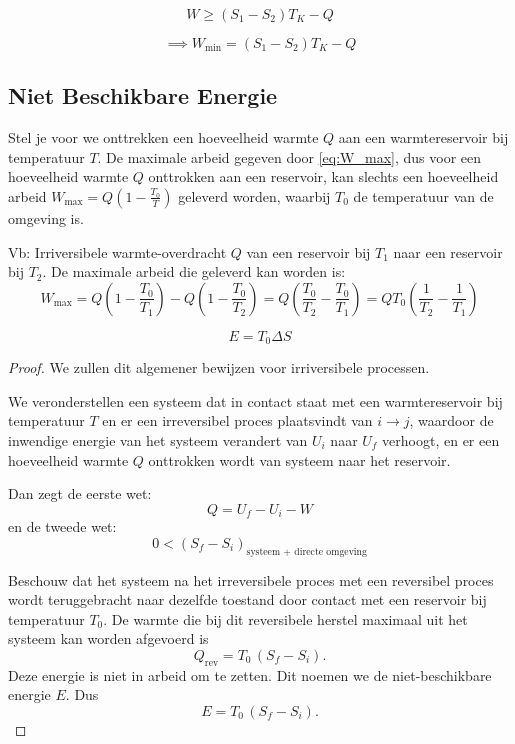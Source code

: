 \[
W \geq (S_1-S_2)T_K - Q
\]

\begin{equation}
\label{eq:W_min}
\implies W_{\text{min}} = (S_1-S_2)T_K - Q
\end{equation}

\subsection{Niet Beschikbare Energie}

Stel je voor we onttrekken een hoeveelheid warmte \(Q\) aan een warmtereservoir bij temperatuur \(T\).
De maximale arbeid gegeven door \eqref{eq:W_max}, dus voor een hoeveelheid warmte \(Q\) onttrokken aan een reservoir,
kan slechts een hoeveelheid arbeid \(W_{\text{max}} = Q \left(1 - \frac{T_0}{T}\right)\) geleverd worden, waarbij \(T_0\) de temperatuur van de omgeving is.

Vb: Irriversibele warmte-overdracht \(Q\) van een reservoir bij \(T_1\) naar een reservoir bij \(T_2\).
De maximale arbeid die geleverd kan worden is:
\[
W_{\text{max}}
=
Q \left(1 - \frac{T_0}{T_1}\right) - Q \left(1 - \frac{T_0}{T_2}\right)
=
Q \left(\frac{T_0}{T_2} - \frac{T_0}{T_1}\right)
=
Q T_0 \left(\frac{1}{T_2} - \frac{1}{T_1}\right)
\]

\[E = T_0 \Delta S\]

\begin{proof}
    We zullen dit algemener bewijzen voor irriversibele processen.

    We veronderstellen een systeem dat in contact staat met een warmtereservoir bij temperatuur \(T\) en er een irreversibel proces plaatsvindt van \(i \to j\),
    waardoor de inwendige energie van het systeem verandert van \(U_i\) naar \(U_f\) verhoogt, en er een hoeveelheid warmte \(Q\) onttrokken wordt van systeem naar het reservoir.

    Dan zegt de eerste wet:
    \[Q = U_f - U_i - W\]
    en de tweede wet:
    \[0 < (S_f-S_i)_{\text{systeem + directe omgeving}}\]

    Beschouw dat het systeem na het irreversibele proces met een reversibel proces wordt teruggebracht
    naar dezelfde toestand door contact met een reservoir bij temperatuur $T_0$.
    De warmte die bij dit reversibele herstel maximaal uit het systeem kan worden afgevoerd is
    \[Q_{\mathrm{rev}} = T_0\,(S_f - S_i).\]
    Deze energie is niet in arbeid om te zetten. Dit noemen we de niet-beschikbare energie $E$. Dus
    \[E = T_0\,(S_f - S_i).\]
\end{proof}

